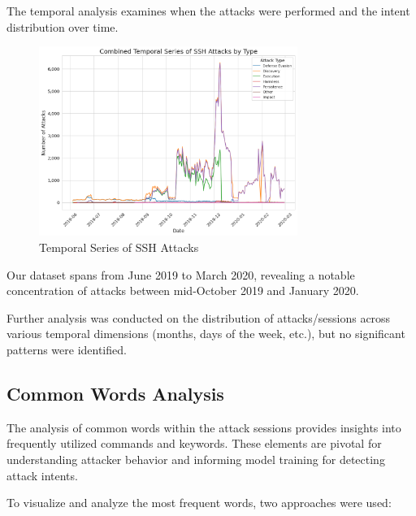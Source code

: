         The temporal analysis examines when the attacks were performed and the intent distribution over time.
        
        \begin{figure}[H]
            \centering
            \includegraphics[width=0.75\textwidth]{../figures/plots/section1/combined_temporal_series_of_ssh_attacks_by_type.png}
            \caption{Temporal Series of SSH Attacks}
            \label{fig:temporal-analysis}
        \end{figure}
        
        Our dataset spans from June 2019 to March 2020, revealing a notable concentration of attacks between mid-October 2019 and January 2020.

        Further analysis was conducted on the distribution of attacks/sessions across various temporal dimensions (months, days of the week, etc.), but no significant patterns were identified.
        

    \subsection{Common Words Analysis}
    
        The analysis of common words within the attack sessions provides insights into frequently utilized commands and keywords. These elements are pivotal for understanding attacker behavior and informing model training for detecting attack intents. 

        To visualize and analyze the most frequent words, two approaches were used: 
        

